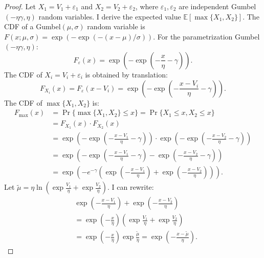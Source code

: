 \documentclass[12pt]{article}
\theoremstyle{plain}
\begin{document}
\begin{proof}
	Let $X_1 = V_1 + \varepsilon_1$ and $X_2 = V_2 + \varepsilon_2$, where $\varepsilon_1, \varepsilon_2$ are independent Gumbel$(-\eta\gamma, \eta)$ random variables. I derive the expected value $\mathbb{E}[\max\{X_1, X_2\}]$. The CDF of a Gumbel$(\mu, \sigma)$ random variable is $F(x; \mu, \sigma) =
		\exp(-\exp(-(x - \mu)/\sigma))$. For the parametrization Gumbel$(-\eta\gamma,
		\eta)$:
	\begin{equation*}
		F_\varepsilon(x) = \exp\left(-\exp\left(-\frac{x}{\eta} - \gamma\right)\right).
	\end{equation*}
	The CDF of $X_i = V_i + \varepsilon_i$ is obtained by translation:
	\begin{equation*}
		F_{X_i}(x) = F_\varepsilon(x - V_i) = \exp\left(-\exp\left(-\frac{x - V_i}{\eta} - \gamma\right)\right).
	\end{equation*}
	The CDF of $\max\{X_1, X_2\}$ is:
	\begin{align*}
		F_{\max}(x) & = \Pr\{\max\{X_1, X_2\} \leq x\} = \Pr\{X_1 \leq x, X_2 \leq x\}                                                                            \\
		            & = F_{X_1}(x) \cdot F_{X_2}(x)                                                                                                               \\
		            & = \exp\left(-\exp\left(-\frac{x - V_1}{\eta} - \gamma\right)\right) \cdot \exp\left(-\exp\left(-\frac{x - V_2}{\eta} - \gamma\right)\right) \\
		            & = \exp\left(-\exp\left(-\frac{x - V_1}{\eta} - \gamma\right) - \exp\left(-\frac{x - V_2}{\eta} - \gamma\right)\right)                       \\
		            & = \exp\left(-e^{-\gamma}\left(\exp\left(-\frac{x - V_1}{\eta}\right) + \exp\left(-\frac{x - V_2}{\eta}\right)\right)\right).
	\end{align*}
	Let $\tilde{\mu} = \eta \ln\left(\exp\frac{V_1}{\eta} +
		\exp\frac{V_2}{\eta}\right)$. I can rewrite:
	\begin{align*}
		 & \exp\left(-\frac{x - V_1}{\eta}\right) + \exp\left(-\frac{x - V_2}{\eta}\right)                                   \\
		 & = \exp\left(-\frac{x}{\eta}\right)\left(\exp\frac{V_1}{\eta} + \exp\frac{V_2}{\eta}\right)                        \\
		 & = \exp\left(-\frac{x}{\eta}\right) \exp\frac{\tilde{\mu}}{\eta} = \exp\left(-\frac{x - \tilde{\mu}}{\eta}\right).

\end{align*}
\end{proof}
\end{document}
